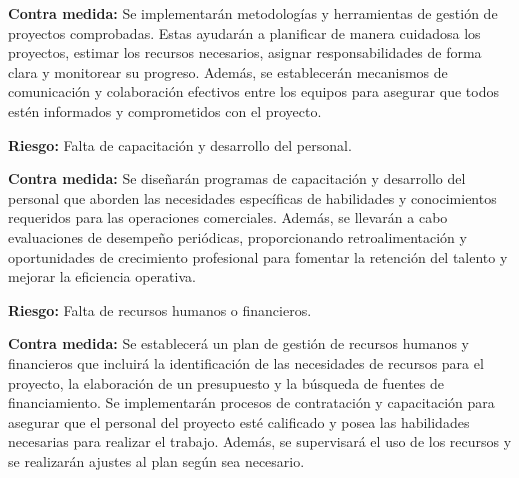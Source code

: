 \textbf{Contra medida:} Se implementarán metodologías y herramientas de gestión de proyectos comprobadas. Estas ayudarán a planificar de manera cuidadosa los proyectos, estimar los recursos necesarios, asignar responsabilidades de forma clara y monitorear su progreso. Además, se establecerán mecanismos de comunicación y colaboración efectivos entre los equipos para asegurar que todos estén informados y comprometidos con el proyecto.

\textbf{Riesgo:} Falta de capacitación y desarrollo del personal.

\textbf{Contra medida:} Se diseñarán programas de capacitación y desarrollo del personal que aborden las necesidades específicas de habilidades y conocimientos requeridos para las operaciones comerciales. Además, se llevarán a cabo evaluaciones de desempeño periódicas, proporcionando retroalimentación y oportunidades de crecimiento profesional para fomentar la retención del talento y mejorar la eficiencia operativa.

\textbf{Riesgo:} Falta de recursos humanos o financieros.

\textbf{Contra medida:} Se establecerá un plan de gestión de recursos humanos y financieros que incluirá la identificación de las necesidades de recursos para el proyecto, la elaboración de un presupuesto y la búsqueda de fuentes de financiamiento. Se implementarán procesos de contratación y capacitación para asegurar que el personal del proyecto esté calificado y posea las habilidades necesarias para realizar el trabajo. Además, se supervisará el uso de los recursos y se realizarán ajustes al plan según sea necesario.
